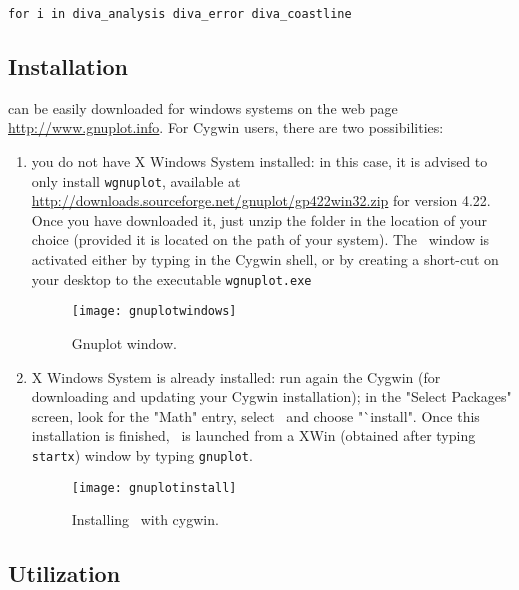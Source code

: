 \verb#for i in diva_analysis diva_error diva_coastline#

\subsection{Installation}

\gnuplot can be easily downloaded for windows systems on the web page \url{http://www.gnuplot.info}. For Cygwin users, there are two possibilities:

\begin{enumerate}

\item you do not have X Windows System installed: in this case, it is advised to only install \texttt{wgnuplot}, available at\\
\url{http://downloads.sourceforge.net/gnuplot/gp422win32.zip} for version 4.22.\\
Once you have downloaded it, just unzip the folder in the location of your choice (provided it is located on the path of your system). The \gnuplot\, window is activated either by typing  in the Cygwin shell, or by creating a short-cut on your desktop to the executable \texttt{wgnuplot.exe}


\begin{figure}[htpb]
\centering
\parbox{.6\textwidth}{
\texttt{[image: gnuplotwindows]}
}\parbox{.4\textwidth}{
\caption{Gnuplot window.\label{fig:gnuplotwindows}}
}
\end{figure}

\item X Windows System is already installed: run again the Cygwin  (for downloading and updating your Cygwin installation); in the "Select Packages" screen, look for the "Math" entry, select \gnuplot\, and choose "`install". Once this installation is finished, \gnuplot\, is launched from a XWin (obtained after typing \texttt{startx}) window by typing \texttt{gnuplot}.

\begin{figure}[htpb]
\centering
\parbox{.7\textwidth}{
\texttt{[image: gnuplotinstall]}
}\parbox{.3\textwidth}{
\caption{Installing \gnuplot\, with cygwin.\label{fig:gnuplotinstall}}
}
\end{figure}

\end{enumerate} 


\subsection{Utilization}


